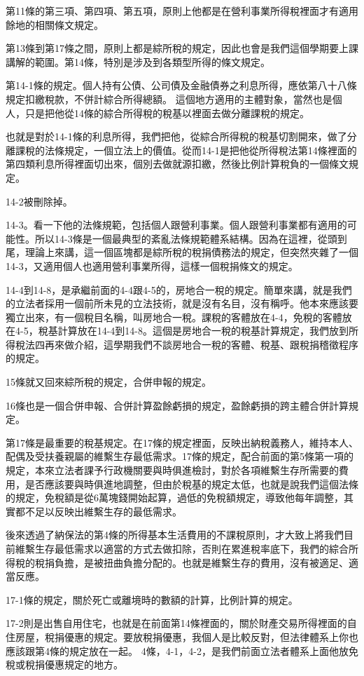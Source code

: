 \documentclass[oneside,sub3section]{ctexbook}
\begin{document}
第11條的第三項、第四項、第五項，原則上他都是在營利事業所得稅裡面才有適用餘地的相關條文規定。

第13條到第17條之間，原則上都是綜所稅的規定，因此也會是我們這個學期要上課講解的範圍。第14條，特別是涉及到各類型所得的條文規定。

第14-1條的規定。個人持有公債、公司債及金融債券之利息所得，應依第八十八條規定扣繳稅款，不併計綜合所得總額。
這個地方適用的主體對象，當然也是個人，只是把他從14條的綜合所得稅的稅基以裡面去做分離課稅的規定。

也就是對於14-1條的利息所得，我們把他，從綜合所得稅的稅基切割開來，做了分離課稅的法條規定，一個立法上的價值。從而14-1是把他從所得稅法第14條裡面的第四類利息所得裡面切出來，個別去做就源扣繳，然後比例計算稅負的一個條文規定。

14-2被刪除掉。

14-3。看一下他的法條規範，包括個人跟營利事業。個人跟營利事業都有適用的可能性。所以14-3條是一個最典型的紊亂法條規範體系結構。因為在這裡，從頭到尾，理論上來講，這一個區塊都是綜所稅的稅捐債務法的規定，但突然夾雜了一個14-3，又適用個人也適用營利事業所得，這樣一個稅捐條文的規定。

14-4到14-8，是承繼前面的4-4跟4-5的，房地合一稅的規定。簡單來講，就是我們的立法者採用一個前所未見的立法技術，就是沒有名目，沒有稱呼。他本來應該要獨立出來，有一個稅目名稱，叫房地合一稅。課稅的客體放在4-4，免稅的客體放在4-5，稅基計算放在14-4到14-8。這個是房地合一稅的稅基計算規定，我們放到所得稅法四再來做介紹，這學期我們不談房地合一稅的客體、稅基、跟稅捐稽徵程序的規定。

15條就又回來綜所稅的規定，合併申報的規定。

16條也是一個合併申報、合併計算盈餘虧損的規定，盈餘虧損的跨主體合併計算規定。

第17條是最重要的稅基規定。在17條的規定裡面，反映出納稅義務人，維持本人、配偶及受扶養親屬的維繫生存最低需求。17條的規定，配合前面的第5條第一項的規定，本來立法者課予行政機關要與時俱進檢討，對於各項維繫生存所需要的費用，是否應該要與時俱進地調整，但由於稅基的規定太低，也就是說我們這個法條的規定，免稅額是從6萬塊錢開始起算，過低的免稅額規定，導致他每年調整，其實都不足以反映出維繫生存的最低需求。

後來透過了納保法的第4條的所得基本生活費用的不課稅原則，才大致上將我們目前維繫生存最低需求以適當的方式去做扣除，否則在累進稅率底下，我們的綜合所得稅的稅捐負擔，是被扭曲負擔分配的。也就是維繫生存的費用，沒有被適足、適當反應。

17-1條的規定，關於死亡或離境時的數額的計算，比例計算的規定。

17-2則是出售自用住宅，也就是在前面第14條裡面的，關於財產交易所得裡面的自住房屋，稅捐優惠的規定。要放稅捐優惠，我個人是比較反對，但法律體系上你也應該跟第4條的規定放在一起。
4條，4-1，4-2，是我們前面立法者體系上面他放免稅或稅捐優惠規定的地方。
\end{document}
